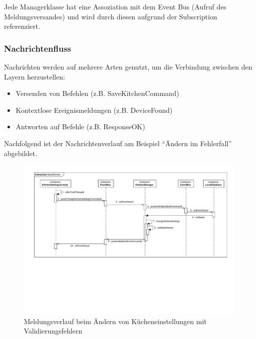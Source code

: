 Jede Managerklasse hat eine Assoziation mit dem Event Bus (Aufruf des Meldungsversandes) und wird durch diesen aufgrund der Subscription referenziert.

\subsubsection{Nachrichtenfluss}
Nachrichten werden auf mehrere Arten genutzt, um die Verbindung zwischen den Layern herzustellen:

\begin{itemize}
\item{Versenden von Befehlen (z.B. SaveKitchenCommand)}
\item{Kontextlose Ereignismeldungen (z.B. DeviceFound)}
\item{Antworten auf Befehle (z.B. ResponseOK)}
\end{itemize}

Nachfolgend ist der Nachrichtenverlauf am Beispiel \enquote{Ändern im Fehlerfall} abgebildet.

\begin{figure}[H]
    \begin{center}
        \includegraphics[trim=40 225 30 30,clip,scale=0.55]{results/res/messages}
    \end{center}
    \caption{Meldungsverlauf beim Ändern von Kücheneinstellungen mit Validierungsfehlern}
    \label{abb:messages}
\end{figure}

